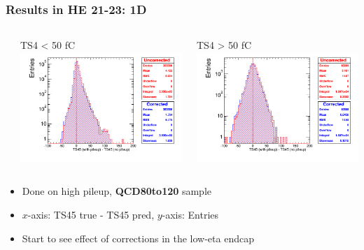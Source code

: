 \documentclass[bigger]{beamer}
\providecommand{\alert}[1]{\textbf{#1}}
\begin{document}
\begin{frame}
\frametitle{Results in HE 21-23: 1D}
\label{sec-3-3-11}
\begin{columns} %
\label{sec-3-3-11-1}
\begin{column}{0.55\textwidth}
\label{sec-3-3-11-1-1}

\centering
TS4 < 50 fC
\includegraphics[width=\textwidth]{fig/correction_comparison_1D_sample80to120_under50_ring2.png}
\end{column}
\begin{column}{0.55\textwidth}
\label{sec-3-3-11-1-2}

\centering
TS4 > 50 fC
\includegraphics[width=\textwidth]{fig/correction_comparison_1D_sample80to120_over50_ring2.png}
\end{column}
\end{columns}
\label{sec-3-3-11-2}
\begin{itemize}

\item Done on high pileup, \alert{QCD80to120} sample
\label{sec-3-3-11-2-1}%

\item $x$-axis: TS45 true - TS45 pred, $y$-axis: Entries
\label{sec-3-3-11-2-2}%

\item Start to see effect of corrections in the low-eta endcap
\label{sec-3-3-11-2-3}%
\end{itemize} %
\end{frame}
\end{document}
